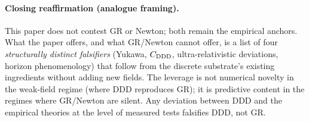 \documentclass[11pt,a4paper]{article}
\begin{document}





\paragraph{Closing reaffirmation (analogue framing).}
This paper does not contest GR or Newton; both remain the
empirical anchors. What the paper offers, and what GR/Newton
cannot offer, is a list of four \emph{structurally distinct
falsifiers} (Yukawa, $C_{\rm DDD}$, ultra-relativistic
deviations, horizon phenomenology) that follow from the
discrete substrate's existing ingredients without adding new
fields. The leverage is not numerical novelty in the weak-field
regime (where DDD reproduces GR); it is predictive content in
the regimes where GR/Newton are silent. Any deviation between
DDD and the empirical theories at the level of measured tests
falsifies DDD, not GR.
\end{document}
